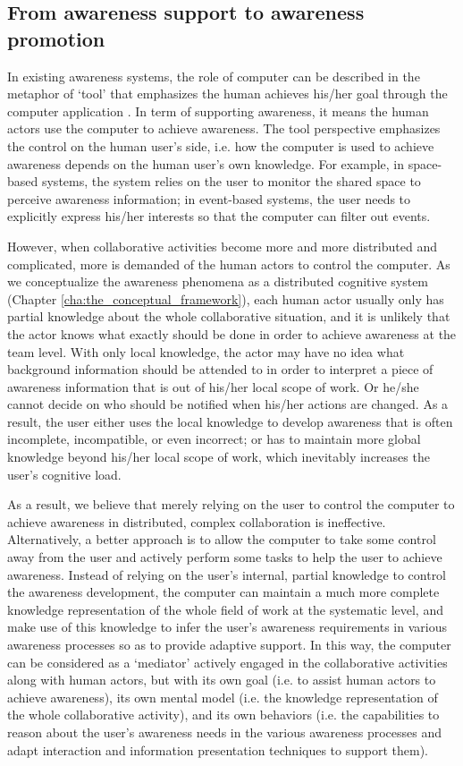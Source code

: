 \subsection{From awareness support to awareness promotion} %
\label{sub:from_awareness_support_to_awareness_promotion}
In existing awareness systems, the role of computer can be described in the metaphor of `tool' that emphasizes the human achieves his/her goal through the computer application \cite{Bodker1997}. In term of supporting awareness, it means the human actors use the computer to achieve awareness. The tool perspective emphasizes the control on the human user's side, i.e. how the computer is used to achieve awareness depends on the human user's own knowledge. For example, in space-based systems, the system relies on the user to monitor the shared space to perceive awareness information; in event-based systems, the user needs to explicitly express his/her interests so that the computer can filter out events. 

However, when collaborative activities become more and more distributed and complicated, more is demanded of the human actors to control the computer. As we conceptualize the awareness phenomena as a distributed cognitive system (Chapter \ref{cha:the_conceptual_framework}), each human actor usually only has partial knowledge about the whole collaborative situation, and it is unlikely that the actor knows what exactly should be done in order to achieve awareness at the team level. With only local knowledge, the actor may have no idea what background information should be attended to in order to interpret a piece of awareness information that is out of his/her local scope of work. Or he/she cannot decide on who should be notified when his/her actions are changed. As a result, the user either uses the local knowledge to develop awareness that is often incomplete, incompatible, or even incorrect; or has to maintain more global knowledge beyond his/her local scope of work, which inevitably increases the user's cognitive load. 

As a result, we believe that merely relying on the user to control the computer to achieve awareness in distributed, complex collaboration is ineffective. Alternatively, a better approach is to allow the computer to take some control away from the user and actively perform some tasks to help the user to achieve awareness. Instead of relying on the user's internal, partial knowledge to control the awareness development, the computer can maintain a much more complete knowledge representation of the whole field of work at the systematic level, and make use of this knowledge to infer the user's awareness requirements in various awareness processes so as to provide adaptive support. In this way, the computer can be considered as a `mediator' actively engaged in the collaborative activities along with human actors, but with its own goal (i.e. to assist human actors to achieve awareness), its own mental model (i.e. the knowledge representation of the whole collaborative activity), and its own behaviors (i.e. the capabilities to reason about the user's awareness needs in the various awareness processes and adapt interaction and information presentation techniques to support them).

